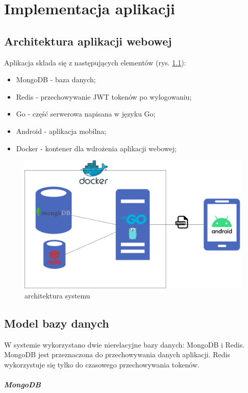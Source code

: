 \chapter{Implementacja aplikacji}
%
\section{Architektura aplikacji webowej}
Aplikacja składa się z następujących elementów (rys. \ref{fig:systemarchitecturediagram}):
\begin{itemize}
\item MongoDB - baza danych;
\item Redis - przechowywanie JWT tokenów po wylogowaniu;
\item Go - część serwerowa napisana w języku Go;
\item Android - aplikacja mobilna;
\item Docker - kontener dla wdrożenia aplikacji webowej;
\end{itemize}
\begin{figure}[ht]
\centering
\includegraphics[width=0.8\linewidth]{rys03/system_architecture_diagram.png}
\caption{architektura systemu \cite{diagrams_net}}
\label{fig:systemarchitecturediagram}
\end{figure}
\section{Model bazy danych}
W systemie wykorzystano dwie nierelacyjne bazy danych: MongoDB i Redis.
MongoDB jest przeznaczona do przechowywania danych aplikacji.
Redis wykorzystuje się tylko do czasowego przechowywania tokenów.

% 
\paragraph{MongoDB}

